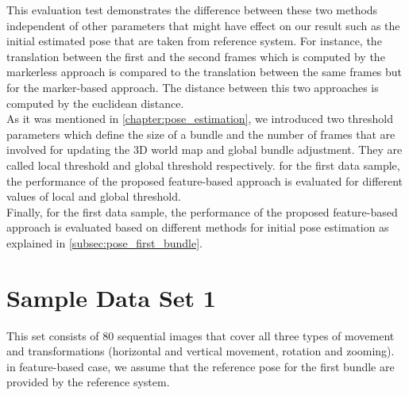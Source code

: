 This evaluation test demonstrates the difference between these two methods independent of other parameters that might have effect on our result such as the initial estimated pose that are taken from reference system. For instance, the translation between the first and the second frames which is computed by the markerless approach is compared to the translation between the same frames but for the marker-based approach. The distance between this two approaches is computed by the euclidean distance.\\
As it was mentioned in \autoref{chapter:pose_estimation}, we introduced two threshold parameters which define the size of a bundle and the number of frames that are involved for updating the 3D world map and global bundle adjustment. They are called local threshold and global threshold respectively. for the first data sample, the performance of the proposed feature-based approach is evaluated for different values of local and global threshold.\\
Finally, for the first data sample, the performance of the proposed feature-based approach is evaluated based on different methods for initial pose estimation as explained in \autoref{subsec:pose_first_bundle}.

\section{Sample Data Set 1} \label{sec:sample_01}
This set consists of 80 sequential images that cover all three types of movement and transformations (horizontal and vertical movement, rotation and zooming). in feature-based case, we assume that the reference pose for the first bundle are provided by the reference system.

